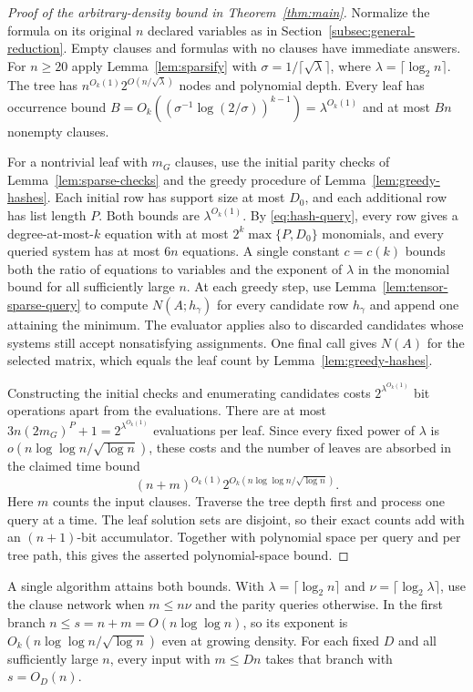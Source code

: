 \begin{proof}[Proof of the arbitrary-density bound in
Theorem~\ref{thm:main}]
Normalize the formula on its original $n$ declared variables as
in Section~\ref{subsec:general-reduction}. Empty clauses and
formulas with no clauses have immediate answers. For $n\ge20$
apply Lemma~\ref{lem:sparsify} with
$\sigma=1/\lceil\sqrt{\lambda}\rceil$, where
$\lambda=\lceil\log_2 n\rceil$. The tree has
$n^{O_k(1)}2^{O(n/\sqrt{\lambda})}$ nodes and polynomial depth.
Every leaf has occurrence bound
$B=O_k((\sigma^{-1}\log(2/\sigma))^{k-1})=\lambda^{O_k(1)}$
and at most $Bn$ nonempty clauses.

For a nontrivial leaf with $m_G$ clauses, use the initial parity
checks of Lemma~\ref{lem:sparse-checks} and the greedy procedure
of Lemma~\ref{lem:greedy-hashes}. Each initial row has support size
at most $D_0$, and each additional row has list length $P$.
Both bounds are $\lambda^{O_k(1)}$. By \eqref{eq:hash-query}, every row
gives a degree-at-most-$k$ equation with at most
$2^k\max\{P,D_0\}$ monomials, and every queried system has at
most $6n$ equations. A single constant $c=c(k)$ bounds both the
ratio of equations to variables and the exponent of $\lambda$ in
the monomial bound for all sufficiently large $n$.
At each greedy step, use Lemma~\ref{lem:tensor-sparse-query} to
compute $N(A;h_\gamma)$ for every candidate row $h_\gamma$ and
append one attaining the minimum. The evaluator applies also to
discarded candidates whose systems still accept nonsatisfying
assignments. One final call gives $N(A)$ for the selected matrix,
which equals the leaf count by Lemma~\ref{lem:greedy-hashes}.

Constructing the initial checks and enumerating candidates costs
$2^{\lambda^{O_k(1)}}$ bit operations apart from the evaluations.
There are at most $3n(2m_G)^P+1=2^{\lambda^{O_k(1)}}$ evaluations
per leaf. Since every fixed power of $\lambda$ is
$o(n\log\log n/\sqrt{\log n})$, these costs and the number of leaves
are absorbed in the claimed time bound
\[
 (n+m)^{O_k(1)}2^{O_k(n\log\log n/\sqrt{\log n})}.
\]
Here $m$ counts the input clauses. Traverse the tree
depth first and process one query at a time. The leaf solution sets
are disjoint, so their exact counts add with an $(n+1)$-bit
accumulator. Together with polynomial space per query and per
tree path, this gives the asserted polynomial-space bound.
\end{proof}

A single algorithm attains both bounds. With
$\lambda=\lceil\log_2 n\rceil$ and $\nu=\lceil\log_2\lambda\rceil$,
use the clause network when $m\le n\nu$ and the parity queries
otherwise. In the first branch $n\le s=n+m=O(n\log\log n)$,
so its exponent is $O_k(n\log\log n/\sqrt{\log n})$ even at growing
density. For each fixed $D$ and all sufficiently large $n$, every
input with $m\le Dn$ takes that branch with $s=O_D(n)$.
